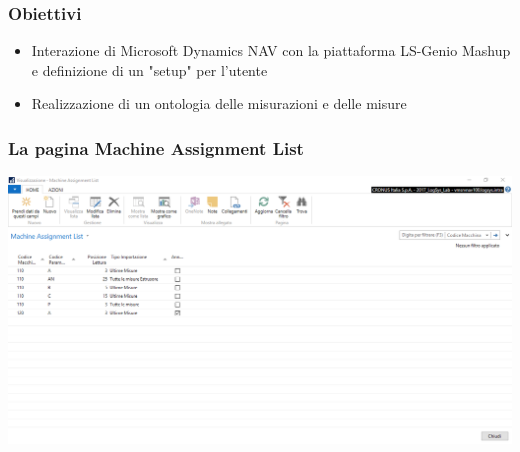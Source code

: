\documentclass{beamer}
\begin{document}
\begin{frame}
\frametitle{Obiettivi}
\begin{itemize}
\item Interazione di Microsoft Dynamics NAV con la piattaforma LS-Genio Mashup e definizione di un "setup" per l'utente

\item Realizzazione di un ontologia delle misurazioni e delle misure
\end{itemize}	
\end{frame}

\begin{frame}
\frametitle{La pagina Machine Assignment List}
\includegraphics[width=1\textwidth]{images/MachineAssignmentList2.png}
\end{frame}



\end{document}
